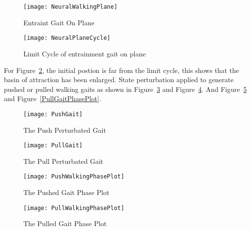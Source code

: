 \begin{figure}[!htbp]
  \begin{center}
     \texttt{[image: NeuralWalkingPlane]}
    \caption{Entraint Gait On Plane}
    \label{fig:neuralwalkinggait}
\end{center}
\end{figure}

\begin{figure}[!htbp]
  \begin{center}
      \texttt{[image: NeuralPlaneCycle]}
    \caption{Limit Cycle of entrainment gait on plane}
    \label{fig:entrainmentLimitCycleOnPlane}
\end{center}
\end{figure}



For Figure~\ref{fig:entrainmentLimitCycleOnPlane}, the initial postion is far from the limit cycle, this shows that the basin of attraction has been enlarged.
State perturbation applied to generate pushed or pulled walking gaits as shown in Figure~\ref{fig:PushGait} and Figure~\ref{fig:PullGait}.
And Figure~\ref{fig:PushGaitPlot} and Figure~\ref{PullGaitPhasePlot}.

\begin{figure}[!htbp]
  \begin{center}
      \texttt{[image: PushGait]}
    \caption{The Push Perturbated Gait}
    \label{fig:PushGait}
\end{center}
\end{figure}


\begin{figure}[!htbp]
  \begin{center}
      \texttt{[image: PullGait]}
    \caption{The Pull Perturbated Gait}
    \label{fig:PullGait}
\end{center}
\end{figure}


\begin{figure}[!htbp]
  \begin{center}
      \texttt{[image: PushWalkingPhasePlot]}
    \caption{The Pushed Gait Phase Plot}
    \label{fig:PushGaitPlot}
\end{center}
\end{figure}


\begin{figure}[!htbp]
  \begin{center}
      \texttt{[image: PullWalkingPhasePlot]}
    \caption{The Pulled Gait Phase Plot}
    \label{fig:PullGaitPhasePlot}
\end{center}
\end{figure}


